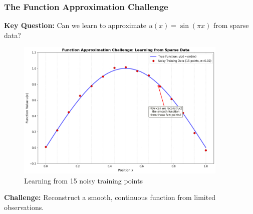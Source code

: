 \documentclass[notes]{beamer}
\begin{document}
\begin{frame}
\frametitle{The Function Approximation Challenge}

\textbf{Key Question:} Can we learn to approximate $u(x) = \sin(\pi x)$ from sparse data?

\begin{figure}[ht]
	\centering
	\includegraphics[width=0.9\textwidth]{figs/sparse-data-challenge.png}
	\caption*{Learning from 15 noisy training points}
\end{figure}

\textbf{Challenge:} Reconstruct a smooth, continuous function from limited observations.

\end{frame}
\end{document}
